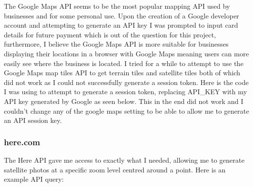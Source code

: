 \documentclass{article}
\begin{document}
            The Google Maps API seems to be the most popular mapping API used by businesses and for some personal use. Upon the creation of a Google developer account and attempting to generate an API key I was prompted to input card details for future payment which is out of the question for this project, furthermore, I believe the Google Maps API is more suitable for businesses displaying their locations in a browser with Google Maps meaning users can more easily see where the business is located. I tried for a while to attempt to use the Google Maps map tiles API to get terrain tiles and satellite tiles both of which did not work as I could not successfully generate a session token. Here is the code I was using to attempt to generate a session token, replacing API\_KEY with my API key generated by Google as seen below. This in the end did not work and I couldn't change any of the google maps setting to be able to allow me to generate an API session key.

        
        
            \lstset{style=mystyle}
            
            

        \subsubsection{here.com}

            The Here API gave me access to exactly what I needed, allowing me to generate satellite photos at a specific zoom level centred around a point. Here is an example API query: \\
\end{document}
